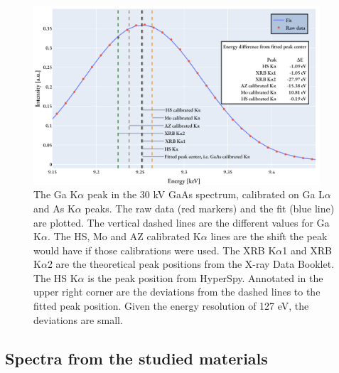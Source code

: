 \begin{figure}[p]
    \centering
    \includegraphics[width=0.95\textwidth]{figures/Ga-K.png}
    \caption{
        The Ga K$\alpha$ peak in the 30 kV GaAs spectrum, calibrated on Ga L$\alpha$ and As K$\alpha$ peaks.
        The raw data (red markers) and the fit (blue line) are plotted.
        The vertical dashed lines are the different values for Ga K$\alpha$.
        The HS, Mo and AZ calibrated K$\alpha$ lines are the shift the peak would have if those calibrations were used.
        The XRB K$\alpha$1 and XRB K$\alpha$2 are the theoretical peak positions from the X-ray Data Booklet.
        The HS K$\alpha$ is the peak position from HyperSpy.
        Annotated in the upper right corner are the deviations from the dashed lines to the fitted peak position.
        Given the energy resolution of 127 eV, the deviations are small.
    }
    \label{fig:results:Ga-K}
\end{figure}


\clearpage

\subsection{Spectra from the studied materials}
\label{sec:results:qualitative:each_sample_area}

